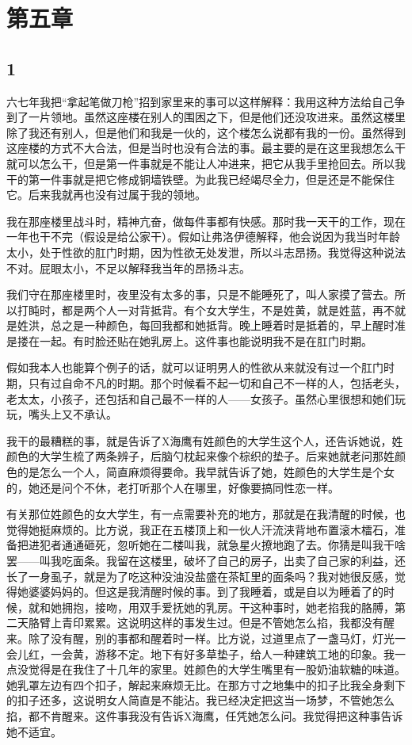 \section{第五章}

\subsection{1}

六七年我把“拿起笔做刀枪”招到家里来的事可以这样解释：我用这种方法给自己争到了一片领地。虽然这座楼在别人的围困之下，但是他们还没攻进来。虽然这楼里除了我还有别人，但是他们和我是一伙的，这个楼怎么说都有我的一份。虽然得到这座楼的方式不大合法，但是当时也没有合法的事。最主要的是在这里我想怎么干就可以怎么干，但是第一件事就是不能让人冲进来，把它从我手里抢回去。所以我干的第一件事就是把它修成铜墙铁壁。为此我已经竭尽全力，但是还是不能保住它。后来我就再也没有过属于我的领地。 

我在那座楼里战斗时，精神亢奋，做每件事都有快感。那时我一天干的工作，现在一年也干不完（假设是给公家干）。假如让弗洛伊德解释，他会说因为我当时年龄太小，处于性欲的肛门时期，因为性欲无处发泄，所以斗志昂扬。我觉得这种说法不对。屁眼太小，不足以解释我当年的昂扬斗志。 

我们守在那座楼里时，夜里没有太多的事，只是不能睡死了，叫人家摸了营去。所以打盹时，都是两个人一对背抵背。有个女大学生，不是姓黄，就是姓蓝，再不就是姓洪，总之是一种颜色，每回我都和她抵背。晚上睡着时是抵着的，早上醒时准是搂在一起。有时脸还贴在她乳房上。这件事也能说明我不是在肛门时期。 

假如我本人也能算个例子的话，就可以证明男人的性欲从来就没有过一个肛门时期，只有过自命不凡的时期。那个时候看不起一切和自己不一样的人，包括老头，老太太，小孩子，还包括和自己最不一样的人——女孩子。虽然心里很想和她们玩玩，嘴头上又不承认。 

我干的最糟糕的事，就是告诉了X海鹰有姓颜色的大学生这个人，还告诉她说，姓颜色的大学生梳了两条辨子，后脑勺枕起来像个棕织的垫子。后来她就老问那姓颜色的是怎么一个人，简直麻烦得要命。我早就告诉了她，姓颜色的大学生是个女的，她还是问个不休，老打听那个人在哪里，好像要搞同性恋一样。 

有关那位姓颜色的女大学生，有一点需要补充的地方，那就是在我清醒的时候，也觉得她挺麻烦的。比方说，我正在五楼顶上和一伙人汗流浃背地布置滚木檑石，准备把进犯者通通砸死，忽听她在二楼叫我，就急星火撩地跑了去。你猜是叫我干啥罢——叫我吃面条。我留在这楼里，破坏了自己的房子，出卖了自己家的利益，还长了一身虱子，就是为了吃这种没油没盐盛在茶缸里的面条吗？我对她很反感，觉得她婆婆妈妈的。但这是我清醒时候的事。到了我睡着，或是自以为睡着了的时候，就和她拥抱，接吻，用双手爱抚她的乳房。干这种事时，她老掐我的胳膊，第二天胳臂上青印累累。这说明这样的事发生过。但是不管她怎么掐，我都没有醒来。除了没有醒，别的事都和醒着时一样。比方说，过道里点了一盏马灯，灯光一会儿红，一会黄，游移不定。地下有好多草垫子，给人一种建筑工地的印象。我一点没觉得是在我住了十几年的家里。姓颜色的大学生嘴里有一股奶油软糖的味道。她乳罩左边有四个扣子，解起来麻烦无比。在那方寸之地集中的扣子比我全身剩下的扣子还多，这说明女人简直是不能沾。我已经决定把这当一场梦，不管她怎么掐，都不肯醒来。这件事我没有告诉X海鹰，任凭她怎么问。我觉得把这种事告诉她不适宜。 

